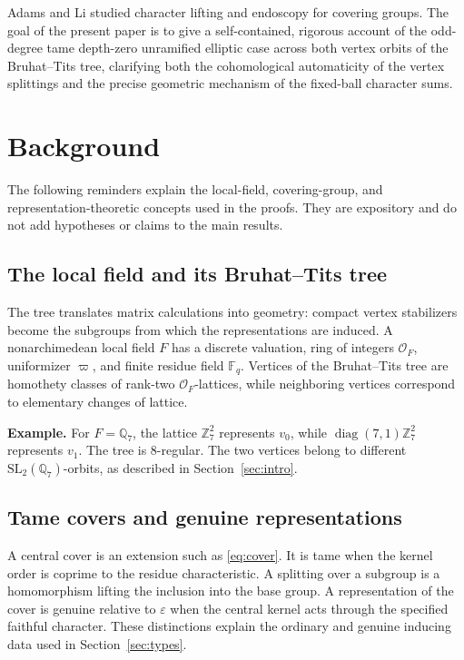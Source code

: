 \documentclass[12pt, letterpaper]{article}
\numberwithin{equation}{section}
\theoremstyle{definition}
\theoremstyle{remark}
\newcommand{\OO}{\mathcal{O}_F}
\newcommand{\kk}{\mathbb{F}_q}
\begin{document}
Adams \cite{Ad03} and Li \cite{Li12} studied character lifting and endoscopy for covering groups. The goal of the present paper is to give a self-contained, rigorous account of the odd-degree tame depth-zero unramified elliptic case across both vertex orbits of the Bruhat--Tits tree, clarifying both the cohomological automaticity of the vertex splittings and the precise geometric mechanism of the fixed-ball character sums.

\section{Background}\label{sec:background}

The following reminders explain the local-field, covering-group, and representation-theoretic concepts used in the proofs. They are expository and do not add hypotheses or claims to the main results.

\subsection{The local field and its Bruhat--Tits tree}

The tree translates matrix calculations into geometry: compact vertex stabilizers become the subgroups from which the representations are induced. A nonarchimedean local field $F$ has a discrete valuation, ring of integers $\OO$, uniformizer $\varpi$, and finite residue field $\kk$. Vertices of the Bruhat--Tits tree are homothety classes of rank-two $\OO$-lattices, while neighboring vertices correspond to elementary changes of lattice.

\noindent\textbf{Example.} For $F=\mathbb{Q}_7$, the lattice $\mathbb{Z}_7^2$ represents $v_0$, while $\operatorname{diag}(7,1)\mathbb{Z}_7^2$ represents $v_1$. The tree is $8$-regular. The two vertices belong to different $\mathrm{SL}_2(\mathbb{Q}_7)$-orbits, as described in Section~\ref{sec:intro}.

\subsection{Tame covers and genuine representations}

A central cover is an extension such as \eqref{eq:cover}. It is tame when the kernel order is coprime to the residue characteristic. A splitting over a subgroup is a homomorphism lifting the inclusion into the base group. A representation of the cover is genuine relative to $\varepsilon$ when the central kernel acts through the specified faithful character. These distinctions explain the ordinary and genuine inducing data used in Section~\ref{sec:types}.
\end{document}

